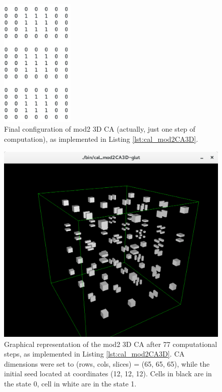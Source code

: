 \begin{figure}
  \begin{center}
    \includegraphics[width=3.5cm]{./images/OpenCAL/mod2_LAST}
    \caption{Final configuration of mod2 3D CA (actually, just one step of computation), as implemented in Listing \ref{lst:cal_mod2CA3D}.}
    \label{fig:mod2_LAST}
  \end{center}
\end{figure}


\begin{figure}
  \begin{center}
    \includegraphics[width=12cm]{./images/OpenCAL/mod23DCA-glut}
    \caption{Graphical representation of the mod2 3D CA after 77 computational steps, as implemented in Listing \ref{lst:cal_mod2CA3D}. CA dimensions were set to (rows, cols, slices) = (65, 65, 65), while the initial seed located at coordinates (12, 12, 12). Cells in black are in the state 0, cell in white are in the state 1.}
    \label{fig:cal_mod2CA3D}
  \end{center}
\end{figure}


